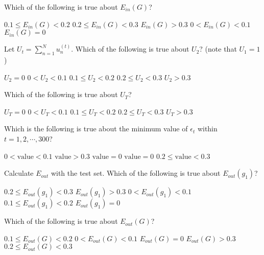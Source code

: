 \documentclass[a4paper,10pt]{exam}
\begin{document}
\begin{questions}
	\question Which of the following is true about $E_{in}(G)$?

	\begin{checkboxes}
		\choice $0.1 \le E_{in}(G) < 0.2$
		\choice $0.2 \le E_{in}(G) < 0.3$
		\choice $E_{in}(G) > 0.3$
		\choice $0 < E_{in}(G) < 0.1$
		\CorrectChoice $E_{in}(G) = 0$\\
	\end{checkboxes}

	\question Let $U_t = \sum_{n=1}^N u_n^{(t)}$. Which of the following is true about $U_2$? (note that $U_1=1$)

	\begin{checkboxes}
		\choice $U_2 = 0$
		\choice $0 < U_2 < 0.1$
		\choice $0.1 \le U_2 < 0.2$
		\choice $0.2 \le U_2 < 0.3$
		\CorrectChoice $U_2 > 0.3$\\
	\end{checkboxes}

	\question Which of the following is true about $U_T$?

	\begin{checkboxes}
		\choice $U_T = 0$
		\CorrectChoice $0 < U_T < 0.1$
		\choice $0.1 \le U_T < 0.2$
		\choice $0.2 \le U_T < 0.3$
		\choice $U_T > 0.3$\\
	\end{checkboxes}

	\question Which is the following is true about the minimum value of $\epsilon_t$ within $t = 1, 2, \cdots, 300$?

	\begin{checkboxes}
		\choice $0 < \mbox{value} < 0.1$
		\choice $\mbox{value} > 0.3$
		\choice $\mbox{value} = 0$
		\CorrectChoice $\mbox{value} = 0$
		\choice $0.2 \le \mbox{value} < 0.3$  \\
	\end{checkboxes}

	\question Calculate $E_{out}$ with the test set. Which of the following is true about $E_{out}(g_1)$?

	\begin{checkboxes}
		\CorrectChoice $0.2 \le E_{out}(g_1) < 0.3$
		\choice $E_{out}(g_1) > 0.3$
		\choice $0 < E_{out}(g_1) < 0.1$
		\choice $0.1 \le E_{out}(g_1) < 0.2$
		\choice $E_{out}(g_1) = 0$\\
	\end{checkboxes}

	\question Which of the following is true about $E_{out}(G)$?\label{q18}

	\begin{checkboxes}
		\CorrectChoice $0.1 \le E_{out}(G) < 0.2$
		\choice  $0 < E_{out}(G) < 0.1$
		\choice $E_{out}(G) = 0$
		\choice $E_{out}(G) > 0.3$
		\choice $0.2 \le E_{out}(G) < 0.3$
	\end{checkboxes}


\end{questions}
\end{document}

